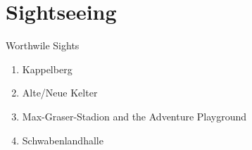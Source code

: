 
\section{Sightseeing}

\begin{frame}{Worthwile Sights}
    \begin{enumerate}
        \item Kappelberg
        \pause \item Alte/Neue Kelter
        \pause \item Max-Graser-Stadion and the Adventure Playground
        \pause \item Schwabenlandhalle
    \end{enumerate}

\end{frame}



\thanksframe
